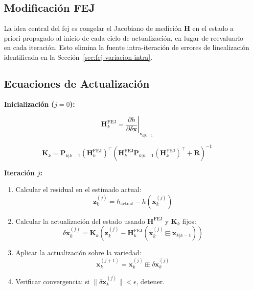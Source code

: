 \subsection{Modificación FEJ}
\label{sec:fej-modificacion}

La idea central del \gls{fej} es congelar el Jacobiano de medición $\mathbf{H}$
en el estado a priori propagado al inicio de cada ciclo de actualización, en
lugar de reevaluarlo en cada iteración. Esto elimina la fuente intra-iteración
de errores de linealización identificada en la
Sección~\ref{sec:fej-variacion-intra}.

\subsection{Ecuaciones de Actualización}
\label{sec:fej-ecuaciones-actualizacion}

\textbf{Inicialización ($j = 0$):}

\begin{equation}
\mathbf{H}_k^{\text{FEJ}} = \left.\frac{\partial h}{\partial \delta\mathbf{x}}\right|_{\mathbf{x}_{k|k-1}}
\label{eq:H-fej}
\end{equation}

\begin{equation}
\mathbf{K}_k = \mathbf{P}_{k|k-1} (\mathbf{H}_k^{\text{FEJ}})^\top \left(\mathbf{H}_k^{\text{FEJ}} \mathbf{P}_{k|k-1} (\mathbf{H}_k^{\text{FEJ}})^\top + \mathbf{R}\right)^{-1}
\label{eq:K-fej}
\end{equation}

\textbf{Iteración $j$:}

\begin{enumerate}
    \item Calcular el residual en el estimado actual:
    \begin{equation}
    \mathbf{z}_k^{(j)} = h_{\text{actual}} - h(\mathbf{x}_k^{(j)})
    \label{eq:residual-fej}
    \end{equation}

    \item Calcular la actualización del estado usando $\mathbf{H}^{\text{FEJ}}$ y $\mathbf{K}_k$ fijos:
    \begin{equation}
    \delta\mathbf{x}_k^{(j)} = \mathbf{K}_k \left(\mathbf{z}_k^{(j)} - \mathbf{H}_k^{\text{FEJ}} (\mathbf{x}_k^{(j)} \boxminus \mathbf{x}_{k|k-1})\right)
    \label{eq:state-update-fej}
    \end{equation}

    \item Aplicar la actualización sobre la variedad:
    \begin{equation}
    \mathbf{x}_k^{(j+1)} = \mathbf{x}_k^{(j)} \boxplus \delta\mathbf{x}_k^{(j)}
    \label{eq:manifold-update-fej}
    \end{equation}

    \item Verificar convergencia: si $\|\delta\mathbf{x}_k^{(j)}\| < \epsilon$, detener.
\end{enumerate}

